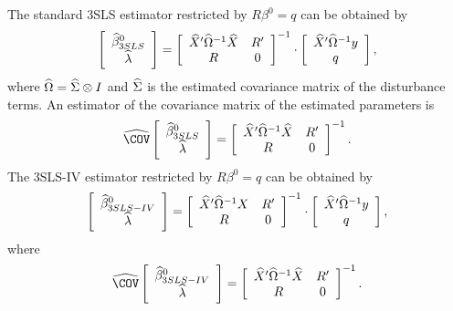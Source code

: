 The standard 3SLS estimator restricted by $R \beta^0 = q$ can be obtained by
\begin{equation}
   \left[ \begin{array}{c}
      \widehat{\beta}^0_{3SLS} \\ \widehat{\lambda}
   \end{array} \right]
   =
   \left[ \begin{array}{cc}
      \widehat{X}' \widehat{\Omega}^{-1} \widehat{X} & R' \\
      R & 0
   \end{array} \right]^{-1}
   \cdot
   \left[ \begin{array}{c}
      \widehat{X}' \widehat{\Omega}^{-1} y \\ q
   \end{array} \right] ,
   \label{eq:3slsGlsR}
\end{equation}
where $\widehat{\Omega} = \widehat{\Sigma} \otimes I$ and
$\widehat{\Sigma}$ is the estimated covariance matrix of the disturbance terms.
An estimator of the covariance matrix of the estimated parameters is
\begin{equation}
   \COVHat
   \left[ \begin{array}{c}
      \widehat{\beta}^0_{3SLS} \\ \widehat{\lambda}
   \end{array} \right] 
   = 
   \left[ \begin{array}{cc}
      \widehat{X}' \OHat^{-1} \widehat{X} & R' \\
      R & 0
   \end{array} \right]^{-1} .
   \label{eq:cov3slsr}
\end{equation}
The 3SLS-IV estimator restricted by $R \beta^0 = q$ can be obtained by
\begin{equation}
   \left[ \begin{array}{c}
      \widehat{\beta}^0_{3SLS-IV} \\ \widehat{\lambda}
   \end{array} \right]
   =
   \left[ \begin{array}{cc}
      \widehat{X}' \widehat{\Omega}^{-1} X & R' \\
      R & 0
   \end{array} \right]^{-1}
   \cdot
   \left[ \begin{array}{c}
      \widehat{X}' \widehat{\Omega}^{-1} y \\ q
   \end{array} \right] ,
   \label{eq:3slsIvR}
\end{equation}
where
\begin{equation}
   \COVHat
   \left[ \begin{array}{c}
      \widehat{\beta}^0_{3SLS-IV} \\ \widehat{\lambda}
   \end{array} \right] 
   = 
   \left[ \begin{array}{cc}
      \widehat{X}' \OHat^{-1} \widehat{X} & R' \\
      R & 0
   \end{array} \right]^{-1} .
\end{equation}
